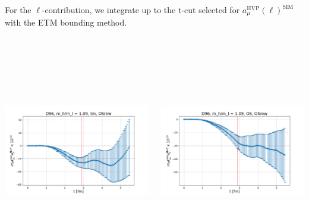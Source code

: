 \documentclass[xcolor={dvipsnames,table}]{beamer}
\begin{document}
\begin{frame}
    For the $\ell$-contribution, we integrate up to the t-cut selected for $a_\mu^\mathrm{HVP}(\ell)^\mathrm{SIM}$ with the ETM bounding method.\vfill \,

    \

    \
    
    \
    
    \begin{columns}
    \begin{column}{0.5\textwidth}
     \includegraphics[trim=0cm 0.3cm 0cm 1.2cm, clip,width=\textwidth]{plots/der_mq_sea_lore/amu_D96_tm_der_001ml.png}
    \end{column}
    \begin{column}{0.5\textwidth}
     \includegraphics[trim=0cm 0.3cm 0cm 1.2cm, clip,width=\textwidth]{plots/der_mq_sea_lore/amu_D96_OS_der_001ml.png}
    \end{column}
   \end{columns}
   \

   \

   \

   \
\end{frame}
\end{document}
